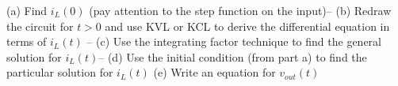 \documentclass{handout}
\begin{document}
(a) Find $i_L(0)$ (pay attention to the step function on the input)-- 
(b) Redraw the circuit for $t>0$ and use KVL or KCL to derive the differential equation in terms of $i_L(t)$ --
(c) Use the integrating factor technique to find the general solution for $i_L(t)$-- 
(d) Use the initial condition (from part a) to find the particular solution for  $i_L(t)$
(e) Write an equation for $v_{out}(t)$


\newpage
\clearpage
\pagebreak

\end{document}
